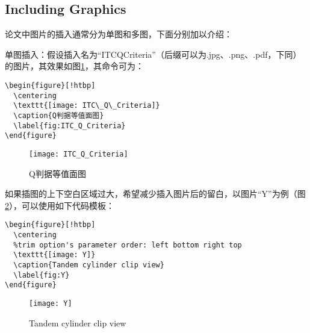 \subsection{Including Graphics}

论文中图片的插入通常分为单图和多图，下面分别加以介绍：

单图插入：假设插入名为“ITC\textunderscore Q\textunderscore Criteria”（后缀可以为.jpg、.png、.pdf，下同）的图片，其效果如图\ref{fig:ITC_Q_Criteria}，其命令可为：
\begin{verbatim}
\begin{figure}[!htbp]
  \centering
  \texttt{[image: ITC\_Q\_Criteria]}
  \caption{Q判据等值面图}
  \label{fig:ITC_Q_Criteria}
\end{figure}
\end{verbatim}
\begin{figure}[!htbp]
  \centering
  \texttt{[image: ITC\_Q\_Criteria]}
  \caption{Q判据等值面图}
  \label{fig:ITC_Q_Criteria}
\end{figure}

如果插图的上下空白区域过大，希望减少插入图片后的留白，以图片“Y”为例（图\ref{fig:Y}），可以使用如下代码模板：
\begin{verbatim}
\begin{figure}[!htbp]
  \centering
  %trim option's parameter order: left bottom right top
  \texttt{[image: Y]}
  \caption{Tandem cylinder clip view}
  \label{fig:Y}
\end{figure}
\end{verbatim}
\begin{figure}[!htbp]
  \centering
  \texttt{[image: Y]}
  \caption{Tandem cylinder clip view}
  \label{fig:Y}
\end{figure}

